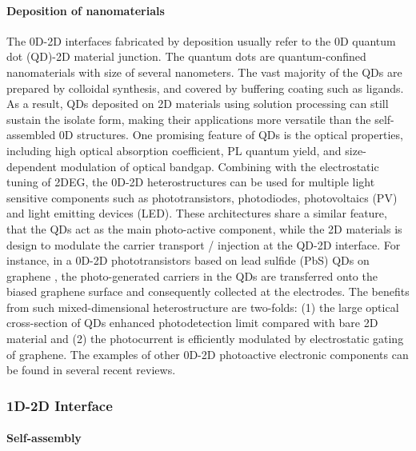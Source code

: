\paragraph{Deposition of nano\-materials}


The 0D-2D interfaces fabricated by deposition usually refer to the 0D
quantum dot (QD)-2D material junction. The quantum dots are
quantum-confined nano\-materials with size of several
nano\-meters. 
%
The vast majority of the QDs are prepared by colloidal synthesis, and
covered by buffering coating such as ligands. 
%
As a result, QDs deposited on 2D materials using solution processing
can still sustain the isolate form, making their applications more
versatile than the self-assembled 0D structures.
%
One promising feature of QDs is the optical properties, including high
optical absorption coefficient, PL quantum yield, and size-dependent
modulation of optical bandgap.
%
Combining with the electrostatic tuning of 2DEG, the 0D-2D
heterostructures can be used for multiple light sensitive components
such as photo\-transistors, photo\-diodes, photo\-voltaics (PV) and
light emitting devices (LED). 
%
These architectures share a similar feature, that the QDs act as the
main photo-active component, while the 2D materials is design to
modulate the carrier transport / injection at the QD-2D interface.
%
For instance, in a 0D-2D photo\-transistors based on lead sulfide
(PbS) QDs on graphene , the
photo-generated carriers in the QDs are transferred onto the biased
graphene surface and consequently collected at the electrodes. The
benefits from such mixed-dimensional heterostructure are two-folds:
(1) the large optical cross-section of QDs enhanced photo\-detection
limit compared with bare 2D material and (2) the photo\-current is
efficiently modulated by electrostatic gating of graphene.
%
The examples of other 0D-2D photo\-active electronic components can be
found in several recent reviews. 


\subsubsection{1D-2D Interface}
\label{sec:orgeadf57e}

\paragraph{Self-assembly}

